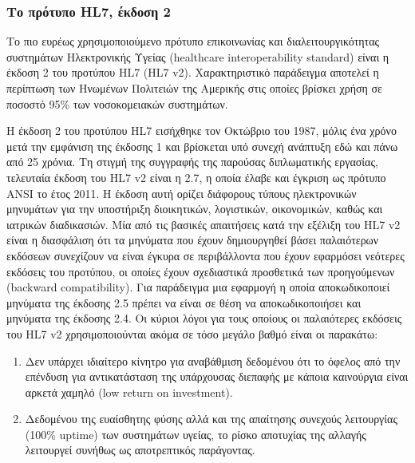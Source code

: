 		\subsubsection{Το πρότυπο HL7, έκδοση 2}
	
		Το πιο ευρέως χρησιμοποιούμενο πρότυπο επικοινωνίας και διαλειτουργικότητας συστημάτων Ηλεκτρονικής Υγείας (healthcare interoperability standard) είναι η έκδοση 2 του προτύπου HL7 (HL7 v2). Χαρακτηριστικό παράδειγμα αποτελεί η περίπτωση των Ηνωμένων Πολιτειών της Αμερικής στις οποίες βρίσκει χρήση σε ποσοστό 95\% των νοσοκομειακών συστημάτων\cite{benson2012principles}.
		
		Η έκδοση 2 του προτύπου HL7 εισήχθηκε τον Οκτώβριο του 1987, μόλις ένα χρόνο μετά την εμφάνιση της έκδοσης 1 και βρίσκεται υπό συνεχή ανάπτυξη εδώ και πάνω από 25 χρόνια. Τη στιγμή της συγγραφής της παρούσας διπλωματικής εργασίας, τελευταία έκδοση του HL7 v2 είναι η 2.7, η οποία έλαβε και έγκριση ως πρότυπο ANSI το έτος 2011\cite{HL7Version27}. Η έκδοση αυτή ορίζει διάφορους τύπους ηλεκτρονικών μηνυμάτων για την υποστήριξη διοικητικών, λογιστικών, οικονομικών, καθώς και ιατρικών διαδικασιών. Μία από τις βασικές απαιτήσεις κατά την εξέλιξη του HL7 v2 είναι η διασφάλιση ότι τα μηνύματα που έχουν δημιουργηθεί βάσει παλαιότερων εκδόσεων συνεχίζουν να είναι έγκυρα σε περιβάλλοντα που έχουν εφαρμόσει νεότερες εκδόσεις του προτύπου, οι οποίες έχουν σχεδιαστικά προσθετικά των προηγούμενων (backward compatibility). Για παράδειγμα μια εφαρμογή η οποία αποκωδικοποιεί μηνύματα της έκδοσης 2.5 πρέπει να είναι σε θέση να αποκωδικοποιήσει και μηνύματα της έκδοσης 2.4. Οι κύριοι λόγοι για τους οποίους οι παλαιότερες εκδόσεις του HL7 v2 χρησιμοποιούνται ακόμα σε τόσο μεγάλο βαθμό είναι οι παρακάτω:
		\begin{enumerate}
			\item Δεν υπάρχει ιδιαίτερο κίνητρο για αναβάθμιση δεδομένου ότι το όφελος από την επένδυση για αντικατάσταση της υπάρχουσας διεπαφής με κάποια καινούργια είναι αρκετά χαμηλό (low return on investment).
			\item Δεδομένου της ευαίσθητης φύσης αλλά και της απαίτησης συνεχούς λειτουργίας (100\% uptime) των συστημάτων υγείας, το ρίσκο αποτυχίας της αλλαγής λειτουργεί συνήθως ως αποτρεπτικός παράγοντας.
		\end{enumerate}		 
		
